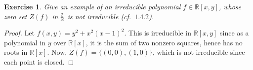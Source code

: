 \documentclass[12pt,letterpaper]{article}
\newtheorem{problem}{Exercise}[section]
\theoremstyle{definition}
\theoremstyle{remark}
\numberwithin{equation}{section}
\numberwithin{figure}{problem}
\let\AA\relax
\DeclareMathOperator{\AA}{\mathbb{A}}
\begin{document}
\begin{problem}
  Give an example of an irreducible polynomial $f \in \mathbb{R}[x,y]$,
  whose zero set $Z(f)$ in $\AA_{\mathbb{R}}^2$ is not irreducible
  \emph{(cf.~$1.4.2$)}.
\end{problem}
\begin{proof}
  Let $f(x,y) = y^2 + x^2(x-1)^2$. This is irreducible in $\mathbb{R}[x,y]$
  since as a polynomial in $y$ over $\mathbb{R}[x]$, it is the sum of two
  nonzero squares, hence has no roots in $\mathbb{R}[x]$. Now, $Z(f) =
  \{(0,0),(1,0)\}$, which is not irreducible since each point is closed.
\end{proof}

\printbibliography
\end{document}
